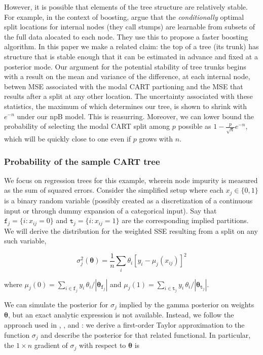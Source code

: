 \documentclass[12pt]{article}
\begin{document}
However, it is possible that elements of the tree structure are
relatively stable. For example, in the context of boosting,
\cite{appel_quickly_2013} argue that the \emph{conditionally} optimal
split locations for internal nodes (they call stumps) are learnable from
subsets of the full data alocated to each node. They use this to propose
a faster boosting algorithm. In this paper we make a related claim: the
top of a tree (its trunk) has structure that is stable enough that it
can be estimated in advance and fixed at a posterior mode. Our argument
for the potential stability of tree trunks begins with a result on the
mean and variance of the difference, at each internal node, betwen MSE
associated with the modal CART partioning and the MSE that results after
a split at any other location. The uncertainty associated with these
statistics, the maximum of which determines our tree, is shown to shrink
with $e^{-n}$ under our npB model. This is reasurring. Moreover, we can
lower bound the probability of selecting the modal CART split among $p$
possible as $1 - \frac{p}{\sqrt{n}} e^{-n}$, which will be quickly close
to one even if $p$ grows with $n$.

    \subsubsection{Probability of the sample CART
tree}\label{probability-of-the-sample-cart-tree}

We focus on regression trees for this example, wherein node impurity is
measured as the sum of squared errors. Consider the simplified setup
where each $x_j \in \{0,1\}$ is a binary random variable (possibly
created as a discretization of a continuous input or through dummy
expansion of a categorical input). Say that
$\texttt{f}_j=\{i:x_{ij}=0\}$ and $\texttt{t}_j=\{i:x_{ij}=1\}$ are the
corresponding implied partitions. We will derive the distribution for
the weighted SSE resulting from a split on any such variable,

\[
\sigma^2_j(\boldsymbol{\theta}) = \frac{1}{n}\sum_i \theta_i \left[y_i - \mu_j(x_{ij})\right]^2
\]

where
$\mu_j(0) = \sum_{i \in \texttt{f}_j}y_i \,\theta_i/\left|\boldsymbol{\theta}_{\texttt{f}_j}\right|$
and
$\mu_j(1) = \sum_{i \in \texttt{t}_j}y_i \,\theta_i/\left|\boldsymbol{\theta}_{\texttt{t}_j}\right|$.

We can simulate the posterior for $\sigma_j$ implied by the gamma
posterior on weights $\boldsymbol{\theta}$, but an exact analytic
expression is not available. Instead, we follow the approach used in
\cite{lancaster_note_2003}, \cite{poirier_bayesian_2011}, and
\cite{taddy_heterogeneous_2014}: we derive a first-order Taylor
approximation to the function $\sigma_j$ and describe the posterior for
that related functional. In particular, the $1\times n$ gradient of
$\sigma_j$ with respect to $\boldsymbol{\theta}$ is
\end{document}

